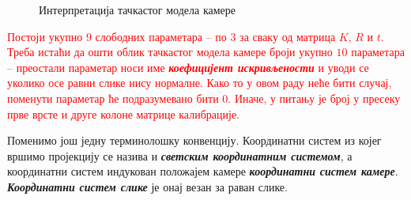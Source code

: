 \documentclass[12pt, a4paper, twoside]{book}
\numberwithin{equation}{chapter}
\numberwithin{theorem}{section}
\numberwithin{definition}{section}
\numberwithin{definitionChapter}{chapter}
\begin{document}
\begin{figure}[H]
\begin{center}
		\end{center}
		\caption{Интерпретација тачкастог модела камере}
		\label{fig-pinhole}
	\end{figure}

	\textcolor{red}{
	Постоји укупно $9$ слободних параметара -- по $3$ за сваку од матрица $K$, $R$ и $t$. Треба истаћи
	да ошти облик тачкастог модела камере броји укупно $10$ параметара -- преостали параметар носи име
	\textbf{\textit{коефицијент искривљености}} и уводи се уколико осе равни слике нису нормалне. Како то
	у овом раду неће бити случај, поменути параметар ће подразумевано бити $0$. Иначе, у питању је 
	број у пресеку прве врсте и друге колоне матрице калибрације.
	}
	
	Поменимо још једну терминолошку конвенцију. Координатни систем из којег вршимо пројекцију се 
	назива и \textbf{\textit{светским координатним системом}}, а координатни систем индукован положајем
	камере \textbf{\textit{координатни систем камере}}. \textbf{\textit{Координатни систем слике}} је
	онај везан за раван слике.
\end{document}
